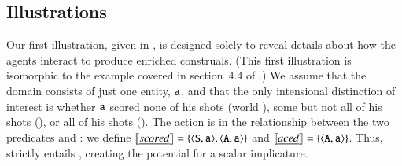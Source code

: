 \documentclass[leqno,12pt]{article}
\begin{document}

\subsection{Illustrations}\label{sec:illustrations}

Our first illustration, given in , is
designed solely to reveal details about how the agents interact to
produce enriched construals. (This first illustration is isomorphic to
the example covered in section~4.4 of
\citealp{Bergen:Levy:Goodman:2014}.) We assume that the domain
consists of just one entity, $\texttt{a}$, and that the only intensional
distinction of interest is whether $\texttt{a}$ scored none of his shots
(world ), some but not all of his shots (), or all
of his shots (). The action is in the relationship between
the two predicates  and : we define
$\llbracket\emph{scored\/}\rrbracket = \left\{ \langle \texttt{S}, \texttt{a} \rangle,
  \langle \texttt{A}, \texttt{a} \rangle \right\}$
and $\llbracket\emph{aced\/}\rrbracket = \left\{ \langle \texttt{A}, \texttt{a} \rangle \right\}$. Thus,
 strictly entails , creating the potential for
a scalar implicature.
\end{document}
